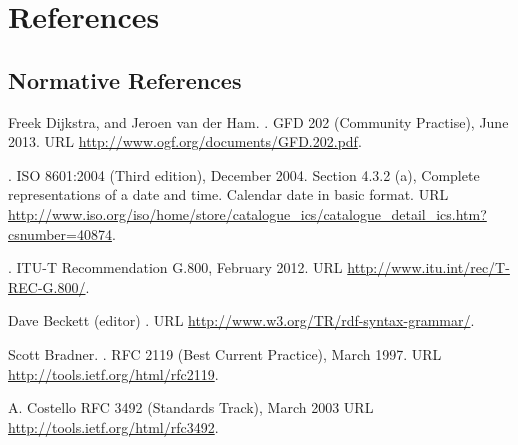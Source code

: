 %
\section*{References}%
\label{s:references}
% 
\renewcommand{\refname}{}

\subsection*{Normative References}
\begin{thebibliography}{10}
\vspace*{-3em}

Freek Dijkstra, and Jeroen van der Ham.
.
\newblock GFD 202 (Community Practise), June 2013.
\newblock URL \url{http://www.ogf.org/documents/GFD.202.pdf}.

.
\newblock ISO 8601:2004 (Third edition), December 2004.
\newblock Section 4.3.2 (a), Complete representations of a date and time. Calendar date in basic format.
\newblock URL \url{http://www.iso.org/iso/home/store/catalogue_ics/catalogue_detail_ics.htm?csnumber=40874}.

.
\newblock ITU-T Recommendation G.800, February 2012.
\newblock URL \url{http://www.itu.int/rec/T-REC-G.800/}.

Dave Beckett (editor)
.
\newblock URL \url{http://www.w3.org/TR/rdf-syntax-grammar/}.

Scott Bradner.
.
\newblock RFC 2119 (Best Current Practice), March 1997.
\newblock URL \url{http://tools.ietf.org/html/rfc2119}.

A. Costello
\newblock RFC 3492 (Standards Track), March 2003
\newblock URL \url{http://tools.ietf.org/html/rfc3492}.


\end{thebibliography}
